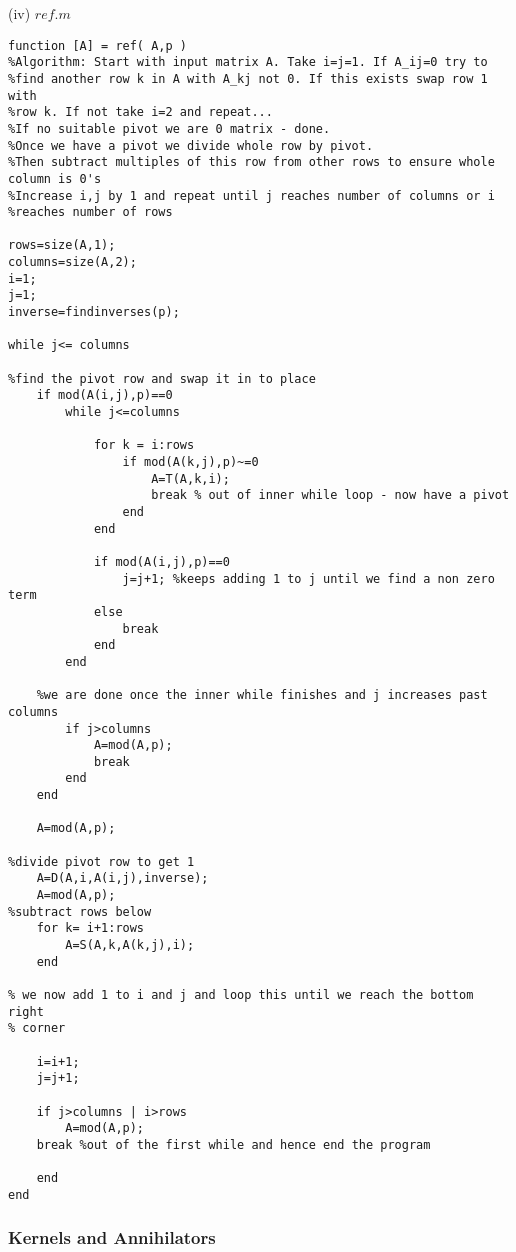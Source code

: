 \documentclass[10pt,a4paper]{report}
\begin{document}
(iv) $ref.m$
\begin{verbatim}
function [A] = ref( A,p )
%Algorithm: Start with input matrix A. Take i=j=1. If A_ij=0 try to
%find another row k in A with A_kj not 0. If this exists swap row 1 with
%row k. If not take i=2 and repeat... 
%If no suitable pivot we are 0 matrix - done.
%Once we have a pivot we divide whole row by pivot.
%Then subtract multiples of this row from other rows to ensure whole column is 0's 
%Increase i,j by 1 and repeat until j reaches number of columns or i
%reaches number of rows

rows=size(A,1);
columns=size(A,2);
i=1;
j=1;
inverse=findinverses(p);

while j<= columns

%find the pivot row and swap it in to place
    if mod(A(i,j),p)==0
        while j<=columns
    
            for k = i:rows
                if mod(A(k,j),p)~=0
                    A=T(A,k,i);
                    break % out of inner while loop - now have a pivot
                end
            end
        
            if mod(A(i,j),p)==0
                j=j+1; %keeps adding 1 to j until we find a non zero term
            else
                break
            end
        end
    
    %we are done once the inner while finishes and j increases past columns
        if j>columns 
            A=mod(A,p);
            break
        end
    end

    A=mod(A,p);

%divide pivot row to get 1
    A=D(A,i,A(i,j),inverse);
    A=mod(A,p);
%subtract rows below
    for k= i+1:rows
        A=S(A,k,A(k,j),i);  
    end

% we now add 1 to i and j and loop this until we reach the bottom right
% corner

    i=i+1;
    j=j+1;

    if j>columns | i>rows
        A=mod(A,p);
    break %out of the first while and hence end the program
    
    end
end
\end{verbatim}
\vspace{1cm}

\subsubsection{Kernels and Annihilators}
\vspace{0.5cm}
\end{document}
